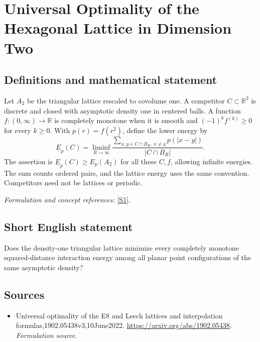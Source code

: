 \documentclass[11pt]{article}
\begin{document}
\section*{\texorpdfstring{Universal Optimality of the Hexagonal Lattice in Dimension Two}{Universal Optimality of the Hexagonal Lattice in Dimension Two}}\label{30006806}
\subsection{Definitions and mathematical statement}
Let $A_2$ be the triangular lattice rescaled to covolume one. A competitor $C\subset{\mathbb{R}}^2$ is discrete and closed with asymptotic density one in centered balls. A function $f:(0,\infty)\to{\mathbb{R}}$ is completely monotone when it is smooth and $(-1)^kf^{(k)}\ge0$ for every $k\ge0$. With $p(r)=f(r^2)$, define the lower energy by
\[
 \underline E_p(C)=\liminf_{R\to\infty}
 \frac{\sum_{x,y\in C\cap B_R,\ x\ne y}p(|x-y|)}{|C\cap B_R|}.
\]
The assertion is $\underline E_p(C)\ge E_p(A_2)$ for all these $C,f$, allowing infinite energies. The sum counts ordered pairs, and the lattice energy uses the same convention. Competitors need not be lattices or periodic.
\par\smallskip\textit{Formulation and concept references:} \href{https://arxiv.org/abs/1902.05438}{[S1]}.

\subsection{Short English statement}
Does the density-one triangular lattice minimize every completely monotone squared-distance interaction energy among all planar point configurations of the same asymptotic density?
\subsection{Sources}
\begin{itemize}
\item[S1]Universal optimality of the E8 and Leech lattices and interpolation formulas,1902.05438v3,10June2022.
\url{https://arxiv.org/abs/1902.05438}.
\textit{Formulation source.}
\end{itemize}
\end{document}
